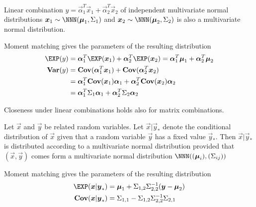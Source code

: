\documentclass[landscape,footrule]{foils}
\renewcommand{\VAR}{\mathbf{Var}}
\newcommand{\COV}{\mathbf{Cov}}
\begin{document}

Linear combination $y=\vec{\alpha}_1^T \vec{x}_1+\vec{\alpha}_2^T\vec{x}_2$ of independent multivariate normal distributions $\vec{x}_1\sim\NNN(\vec{\mu}_1,\Sigma_1)$ and $\vec{x}_2\sim\NNN(\vec{\mu}_2,\Sigma_2)$ is also  a multivariate normal distribution.

\begin{triangles}
\item Moment matching gives the parameters of the resulting distribution 
\begin{align*}
\EXP(y)&= \vec{\alpha}_1^T\EXP(\vec{x}_1)+\vec{\alpha}_2^T\EXP(\vec{x}_2)=
\vec{\alpha}_1^T\vec{\mu}_1+\vec{\alpha}_2^T\vec{\mu}_2\\
\VAR(y)&=\COV(\vec{\alpha}_1^T \vec{x}_1) + \COV(\vec{\alpha}_2^T \vec{x}_2)\\
&=\vec{\alpha}_1^T \COV(\vec{x}_1)\vec{\alpha}_1+ \vec{\alpha}_2^T \COV(\vec{x}_2)\vec{\alpha}_2\\
&=\vec{\alpha}_1^T \Sigma_1\vec{\alpha}_1+ \vec{\alpha}_2^T \Sigma_2\vec{\alpha}_2
\end{align*}
\item Closeness under linear combinations holds also for matrix combinations. 
\end{triangles}


Let $\vec{x}$ and $\vec{y}$ be related random variables. 
Let $\vec{x}|\vec{y}_*$ denote the conditional distribution of $\vec{x}$ given that a random variable $\vec{y}$ has a fixed value $\vec{y}_*$.
Then $\vec{x}|\vec{y}_*$ is distributed according to a multivariate normal distribution provided that 
 $(\vec{x},\vec{y})$ comes form a multivariate normal distribution $\NNN((\vec{\mu}_i),(\Sigma_{ij}))$

\begin{triangles}
\item Moment matching gives the parameters of the resulting distribution 
\begin{align*}
\EXP(\vec{x}|\vec{y}_*)&= \vec{\mu}_1+ \Sigma_{1,2}\Sigma_{2,2}^{-1}(\vec{y}-\vec{\mu}_2)\\
\COV(\vec{x}|\vec{y}_*)&= \Sigma_{1,1}-\Sigma_{1,2}\Sigma_{2,2}^{-1}\Sigma_{2,1}\\
\end{align*}
\end{triangles}

\end{document}
